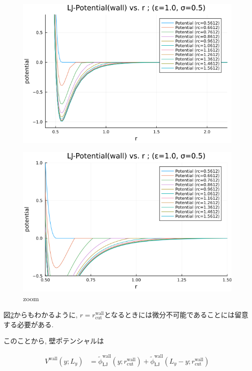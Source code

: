 \documentclass[dvipdfmx]{jsarticle}
\numberwithin{equation}{subsection}
\begin{document}
\begin{figure}[H]
  \centering
  \caption{}
  \label{fig:LJ-Potential_wall_epsilon=1.0-sigma=0.5-rc}
  \includegraphics[scale=0.7]{image/LJ-Potential_wall_epsilon=1.0-sigma=0.5-rc.png}  
\end{figure}
\begin{figure}[H]
  \centering
  \caption{zoom}
  \label{fig:LJ-Potential_wall_epsilon=1.0-sigma=0.5-rc_zoom}
  \includegraphics[scale=0.7]{image/LJ-Potential_wall_epsilon=1.0-sigma=0.5-rc_zoom.png}  
\end{figure}

図\ref{fig:LJ-Potential_wall_epsilon=1.0-sigma=0.5-rc_zoom}からもわかるように, $r = r_{\text{cut}}^{\text{wall}}$となるときには微分不可能であることには留意する必要がある.

このことから, 壁ポテンシャルは

\begin{align}
  V^{\text{wall}}(y; L_y) &= \tilde{\phi}_{\text{LJ}}^{\text{wall}}(y;r_{\text{cut}}^{\text{wall}}) + \tilde{\phi}_{\text{LJ}}^{\text{wall}}(L_y - y;r_{\text{cut}}^{\text{wall}})
\end{align}
\end{document}
